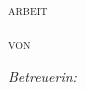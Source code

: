 \begin{titlepage}
\begin{center}
\vspace{.75cm}

\textsc{\Large \thesistype arbeit}\\[1cm] %

%
{\huge \bfseries \ttitle\par}\vspace{1.5cm} %



\textsc{\Large von}\\[.25cm]

{\Large \authorname}

\vspace{.75cm}

\emph{Betreuerin:} \\
\supname\\[1cm]

\groupname%

\vfill

{\large \tdate} %


\vfill
\end{center}

\restoregeometry

\end{titlepage}


